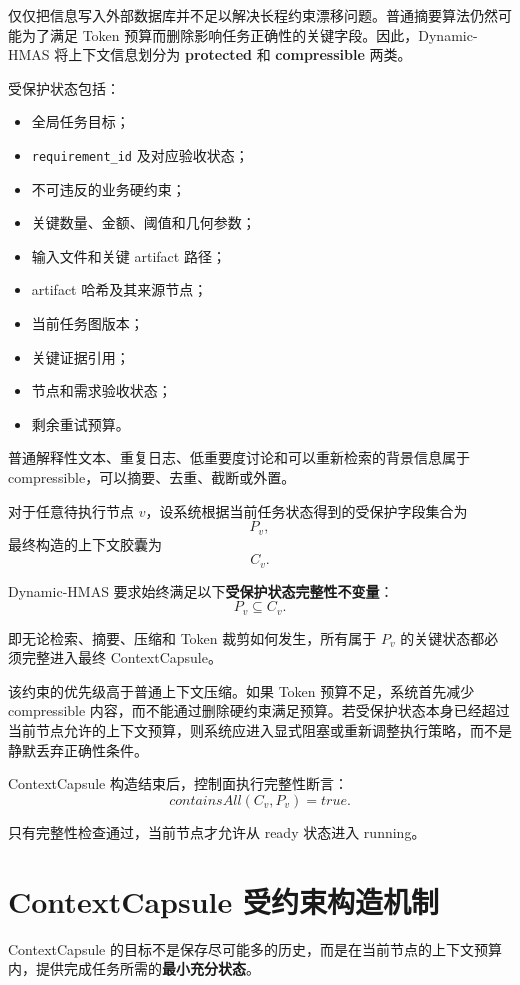 \documentclass[UTF8,a4paper,12pt,oneside]{ctexbook}
\begin{document}
仅仅把信息写入外部数据库并不足以解决长程约束漂移问题。普通摘要算法仍然可能为了满足 Token 预算而删除影响任务正确性的关键字段。因此，Dynamic-HMAS 将上下文信息划分为
\textbf{protected}
和
\textbf{compressible}
两类。

受保护状态包括：

\begin{itemize}
    \item 全局任务目标；
    \item \texttt{requirement\_id} 及对应验收状态；
    \item 不可违反的业务硬约束；
    \item 关键数量、金额、阈值和几何参数；
    \item 输入文件和关键 artifact 路径；
    \item artifact 哈希及其来源节点；
    \item 当前任务图版本；
    \item 关键证据引用；
    \item 节点和需求验收状态；
    \item 剩余重试预算。
\end{itemize}

普通解释性文本、重复日志、低重要度讨论和可以重新检索的背景信息属于 compressible，可以摘要、去重、截断或外置。

对于任意待执行节点 $v$，设系统根据当前任务状态得到的受保护字段集合为
\[
P_v,
\]
最终构造的上下文胶囊为
\[
C_v.
\]

Dynamic-HMAS 要求始终满足以下\textbf{受保护状态完整性不变量}：
\[
P_v\subseteq C_v.
\]

即无论检索、摘要、压缩和 Token 裁剪如何发生，所有属于 $P_v$ 的关键状态都必须完整进入最终 ContextCapsule。

该约束的优先级高于普通上下文压缩。如果 Token 预算不足，系统首先减少 compressible 内容，而不能通过删除硬约束满足预算。若受保护状态本身已经超过当前节点允许的上下文预算，则系统应进入显式阻塞或重新调整执行策略，而不是静默丢弃正确性条件。

ContextCapsule 构造结束后，控制面执行完整性断言：
\[
containsAll(C_v,P_v)=true.
\]

只有完整性检查通过，当前节点才允许从 ready 状态进入 running。


\section{ContextCapsule 受约束构造机制}

ContextCapsule 的目标不是保存尽可能多的历史，而是在当前节点的上下文预算内，提供完成任务所需的\textbf{最小充分状态}。
\end{document}
